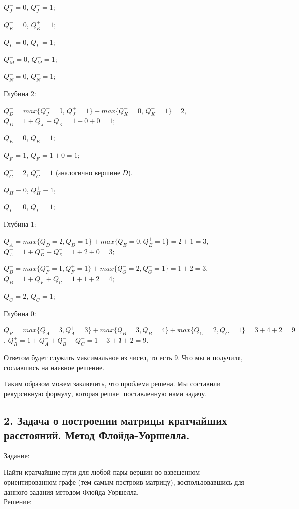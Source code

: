 \documentclass[12pt]{article}
\begin{document}
$Q_{J}^- = 0$, $Q_{J}^+ = 1$;

$Q_{K}^- = 0$, $Q_{K}^+ = 1$;

$Q_{L}^- = 0$, $Q_{L}^+ = 1$;

$Q_{M}^- = 0$, $Q_{M}^+ = 1$;

$Q_{N}^- = 0$, $Q_{N}^+ = 1$;

Глубина 2:

$Q_{D}^- = max\{Q_{J}^- = 0$, $Q_{J}^+ = 1\} + max\{Q_{K}^- = 0$, $Q_{K}^+ = 1\} = 2$, $Q_{D}^+ = 1 + Q_{J}^- + Q_{K}^- = 1 + 0 + 0 = 1 $;

$Q_{E}^- = 0$, $Q_{E}^+ = 1$;

$Q_{F}^- = 1$, $Q_{F}^+ = 1 + 0 = 1$;

$Q_{G}^- = 2$, $Q_{G}^+ = 1$ (аналогично вершине $D$).

$Q_{H}^- = 0$, $Q_{H}^+ = 1$;

$Q_{I}^- = 0$, $Q_{I}^+ = 1$;

Глубина 1:

$Q_{A}^- = max\{Q_{D}^- = 2, Q_{D}^+ = 1\} + max\{Q_{E}^- = 0, Q_{E}^+ = 1\} = 2 + 1 = 3$, $Q_{A}^+ = 1 + Q_{D}^- + Q_{E}^- = 1 + 2 + 0 = 3$;

$Q_{B}^- = max\{Q_{F}^- = 1, Q_{F}^+ = 1\} + max\{Q_{G}^- = 2, Q_{G}^+ = 1\} = 1 + 2 = 3$, $Q_{B}^+ = 1 + Q_{F}^- + Q_{G}^- = 1 + 1 + 2 = 4$;

$Q_{C}^- = 2$, $Q_{C}^+ = 1$;

Глубина 0:

$Q_{R}^- = max\{Q_{A}^- = 3, Q_{A}^+ = 3\} + max\{Q_{B}^- = 3, Q_{B}^+ = 4\} + max\{Q_{C}^- = 2, Q_{C}^+ = 1\} = 3 + 4 + 2 = 9$, $Q_{R}^+ = 1 + Q_{A}^- + Q_{B}^- + Q_{C}^- = 1 + 3 + 3 + 2 = 9$.

Ответом будет служить максимальное из чисел, то есть 9. Что мы и получили, сославшись на наивное решение. 

Таким образом можем заключить, что проблема решена. Мы составили рекурсивную формулу, которая решает поставленную нами задачу.


\subsection*{2. Задача о построении матрицы кратчайших расстояний. Метод Флойда-Уоршелла.}
\underline{Задание}:

Найти кратчайшие пути для любой пары вершин во взвешенном ориентированном графе (тем самым построив матрицу), воспользовавшись для данного задания методом Флойда-Уоршелла. \\
\underline{Решение}: 
\end{document}
